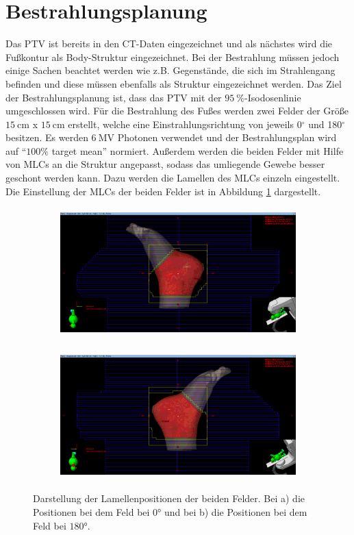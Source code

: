 \section{Bestrahlungsplanung}
\label{sec:Bestrahlungsplanung}
Das PTV ist bereits in den CT-Daten eingezeichnet und als nächstes wird die Fußkontur als Body-Struktur eingezeichnet.
Bei der Bestrahlung müssen jedoch einige Sachen beachtet werden wie z.B. Gegenstände, die sich im Strahlengang befinden und diese müssen
ebenfalls als Struktur eingezeichnet werden. Das Ziel der Bestrahlungsplanung ist, dass das PTV mit der
$\SI{95}{\percent}$-Isodosenlinie umgeschlossen wird.
Für die Bestrahlung des Fußes werden zwei Felder der Größe $\SI{15}{\centi\meter}$ x $\SI{15}{\centi\meter}$ erstellt,
welche eine Einstrahlungsrichtung von jeweils 0$^\circ$ und 180$^\circ$ besitzen.
Es werden $\SI{6}{\mega\volt}$ Photonen verwendet und der Bestrahlungsplan wird auf \enquote{$100\%$ target mean} normiert.
Außerdem werden die beiden Felder mit Hilfe von MLCs an die Struktur angepasst, sodass das umliegende Gewebe besser geschont werden kann.
Dazu werden die Lamellen des MLCs einzeln eingestellt.
Die Einstellung der MLCs der beiden Felder ist in Abbildung \ref{abb:MLC} dargestellt.

\begin{figure}[H]
  \centering
  \begin{subfigure}{\textwidth}
    \centering
    \includegraphics[height = 5cm]{Bilder/MLCFeld1.png}
    \caption{}
  \end{subfigure}
  \begin{subfigure}{\textwidth}
    \centering
    \includegraphics[height=5cm]{Bilder/MLCFeld2.png}
    \caption{}
  \end{subfigure}
  \caption{Darstellung der Lamellenpositionen der beiden Felder. Bei a) die Positionen bei dem Feld bei $0°$ und bei b) die Positionen bei dem Feld bei $180°$.}
  \label{abb:MLC}
\end{figure}
